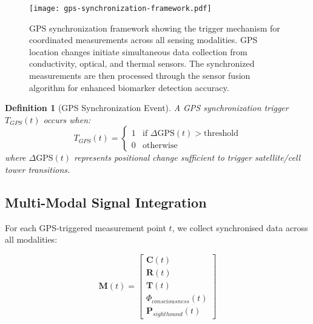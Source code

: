\documentclass[12pt,a4paper]{article}
\newtheorem{definition}[theorem]{Definition}
\begin{document}
\begin{figure}[htbp]
\centering
\texttt{[image: gps-synchronization-framework.pdf]}
\caption{GPS synchronization framework showing the trigger mechanism for coordinated measurements across all sensing modalities. GPS location changes initiate simultaneous data collection from conductivity, optical, and thermal sensors. The synchronized measurements are then processed through the sensor fusion algorithm for enhanced biomarker detection accuracy.}
\label{fig:gps-synchronization-framework}
\end{figure}

\begin{definition}[GPS Synchronization Event]
A GPS synchronization trigger $T_{GPS}(t)$ occurs when:
\begin{equation}
T_{GPS}(t) = \begin{cases}
1 & \text{if } \Delta \text{GPS}(t) > \text{threshold} \\
0 & \text{otherwise}
\end{cases}
\end{equation}
where $\Delta \text{GPS}(t)$ represents positional change sufficient to trigger satellite/cell tower transitions.
\end{definition}

\subsection{Multi-Modal Signal Integration}

For each GPS-triggered measurement point $t$, we collect synchronised data across all modalities:

\begin{equation}
\mathbf{M}(t) = \begin{bmatrix}
\mathbf{C}(t) \\
\mathbf{R}(t) \\
\mathbf{T}(t) \\
\Phi_{consciousness}(t) \\
\mathbf{P}_{sighthound}(t)
\end{bmatrix}
\end{equation}
\end{document}
